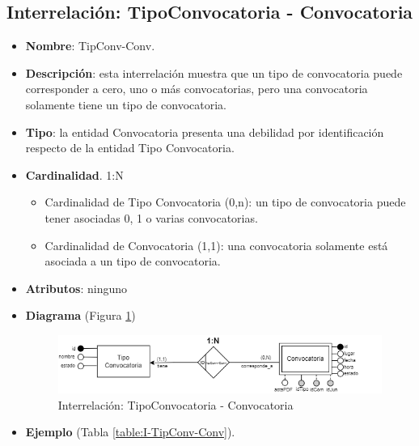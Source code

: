 \subsection{Interrelación: TipoConvocatoria - Convocatoria}
\begin{itemize}
    \item \textbf{Nombre}: TipConv-Conv.
    \item \textbf{Descripción}: esta interrelación muestra que un tipo de convocatoria puede corresponder a cero, uno o más convocatorias, pero una convocatoria solamente tiene un tipo de convocatoria.
    \item \textbf{Tipo}: la entidad Convocatoria presenta una debilidad por identificación respecto de la entidad Tipo Convocatoria.
    \item \textbf{Cardinalidad}. 1:N
    \begin{itemize}
        \item Cardinalidad de Tipo Convocatoria (0,n): un tipo de convocatoria puede tener asociadas 0, 1 o varias convocatorias.
        \item Cardinalidad de Convocatoria (1,1): una convocatoria solamente está asociada a un tipo de convocatoria.
    \end{itemize}
    \item \textbf{Atributos}: ninguno
    \item \textbf{Diagrama} (Figura \ref{fig:I-TipConv-Conv}) 
    \begin{figure}[H]
        \centering
        \includegraphics[scale=0.7]{img/diagramas/EER/I-TipConv-Conv.png}
        \caption{Interrelación: TipoConvocatoria - Convocatoria}
        \label{fig:I-TipConv-Conv}
    \end{figure}
    
    \item \textbf{Ejemplo} (Tabla \ref{table:I-TipConv-Conv}).


\end{itemize}
